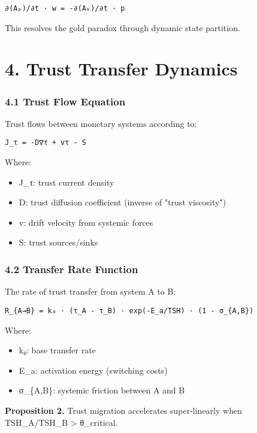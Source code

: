 \documentclass[11pt,oneside]{book}
\begin{document}
\begin{verbatim}
∂(Aₚ)/∂t · w = -∂(Aₖ)/∂t · p
\end{verbatim}

This resolves the gold paradox through dynamic state partition.

\section{4. Trust Transfer Dynamics}

\subsubsection{4.1 Trust Flow Equation}

Trust flows between monetary systems according to:

\begin{verbatim}
J_τ = -D∇τ + vτ - S
\end{verbatim}

Where:
\begin{itemize}
\item J\_τ: trust current density
\item D: trust diffusion coefficient (inverse of "trust viscosity")
\item v: drift velocity from systemic forces
\item S: trust sources/sinks
\end{itemize}

\subsubsection{4.2 Transfer Rate Function}

The rate of trust transfer from system A to B:

\begin{verbatim}
R_{A→B} = k₀ · (τ_A - τ_B) · exp(-E_a/TSH) · (1 - σ_{A,B})
\end{verbatim}

Where:
\begin{itemize}
\item k₀: base transfer rate
\item E\_a: activation energy (switching costs)
\item σ\_\{A,B\}: systemic friction between A and B
\end{itemize}

\textbf{Proposition 2.} Trust migration accelerates super-linearly when TSH_A/TSH_B > θ_critical.
\end{document}
